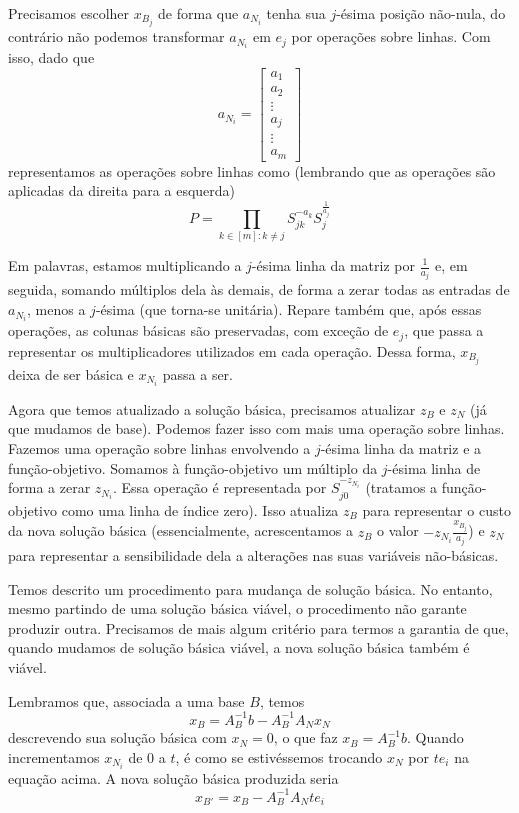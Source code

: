 \documentclass[]{article}
\numberwithin{equation}{section}
\begin{document}
Precisamos escolher $x_{B_j}$ de forma que $a_{N_i}$ tenha sua $j$-ésima posição não-nula, do
contrário não podemos transformar $a_{N_i}$ em $e_j$ por operações sobre linhas.
Com isso, dado que
$$
a_{N_i} =
\begin{bmatrix}
a_1 \\
a_2 \\
\vdots \\
a_j \\
\vdots \\
a_m
\end{bmatrix}
$$
representamos as operações sobre linhas como (lembrando que as operações são aplicadas da direita
para a esquerda)
$$
P = \prod_{k \in [m] : k \neq j} S_{jk}^{-a_k} S_j^{\frac{1}{a_j}}
$$

Em palavras, estamos multiplicando a $j$-ésima linha da matriz por $\frac{1}{a_j}$ e, em seguida,
somando múltiplos dela às demais, de forma a zerar todas as entradas de $a_{N_i}$, menos a $j$-ésima
(que torna-se unitária).
Repare também que, após essas operações, as colunas básicas são preservadas, com exceção de $e_j$,
que passa a representar os multiplicadores utilizados em cada operação.
Dessa forma, $x_{B_j}$ deixa de ser básica e $x_{N_i}$ passa a ser.

Agora que temos atualizado a solução básica, precisamos atualizar $z_B$ e $z_N$ (já que mudamos de
base).
Podemos fazer isso com mais uma operação sobre linhas.
Fazemos uma operação sobre linhas envolvendo a $j$-ésima linha da matriz e a função-objetivo.
Somamos à função-objetivo um múltiplo da $j$-ésima linha de forma a zerar $z_{N_i}$.
Essa operação é representada por $S_{j0}^{-z_{N_i}}$ (tratamos a função-objetivo como uma linha de
índice zero).
Isso atualiza $z_B$ para representar o custo da nova solução básica (essencialmente, acrescentamos
a $z_B$ o valor $-z_{N_i} \frac{x_{B_j}}{a_j}$) e $z_N$ para representar a
sensibilidade dela a alterações nas suas variáveis não-básicas.

Temos descrito um procedimento para mudança de solução básica.
No entanto, mesmo partindo de uma solução básica viável, o procedimento não garante produzir outra.
Precisamos de mais algum critério para termos a garantia de que, quando mudamos de solução básica
viável, a nova solução básica também é viável.

Lembramos que, associada a uma base $B$, temos
$$
x_B = A_B^{-1}b - A_B^{-1}A_Nx_N
$$
descrevendo sua solução básica com $x_N = 0$, o que faz $x_B = A_B^{-1}b$.
Quando incrementamos $x_{N_i}$ de 0 a $t$, é como se estivéssemos trocando $x_N$ por $te_i$ na equação
acima.
A nova solução básica produzida seria
$$
x_{B'} = x_B - A_B^{-1}A_Nte_i
$$
\end{document}
